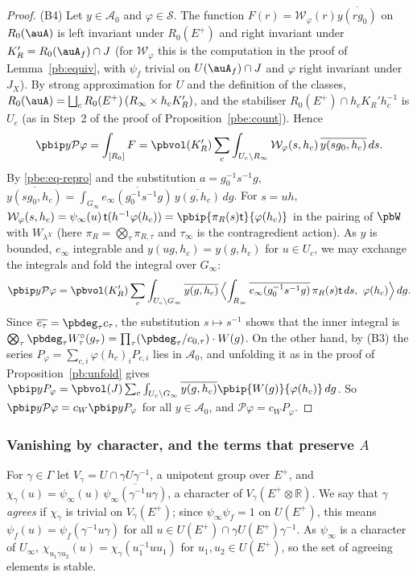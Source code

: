 \documentclass[10pt]{amsart}
\theoremstyle{definition}
\theoremstyle{remark}
\newcommand{\R}{\mathbb R}
\providecommand{\auAz}{\mathcal A_0}
\providecommand{\auP}{\mathcal P}
\providecommand{\auS}{\mathcal S}
\providecommand{\aubar}[1]{\overline{#1}}
\begin{document}
\begin{proof}
(B4) Let $y\in\auAz$ and $\varphi\in\auS$. The function $F(r)=\mathcal W_\varphi(r)\aubar{y(rg_0)}$ on
$R_0(\auA)$ is left invariant under $R_0(E^+)$ and right invariant under $K_R'=R_0(\auA_f)\cap J$
(for $\mathcal W_\varphi$ this is the computation in the proof of Lemma~\ref{pb:equiv}, with
$\psi_f$ trivial on $U(\auA_f)\cap J$ and $\varphi$ right invariant under $J_X$). By strong
approximation for $U$ and the definition of the classes, $R_0(\auA)=\bigsqcup_cR_0(E^+)\,(R_\infty
\times h_cK_R')$, and the stabiliser $R_0(E^+)\cap h_cK_R'h_c^{-1}$ is $U_c$ (as in Step~2 of the
proof of Proposition~\ref{pbe:count}). Hence
\[
\pbip y{\auP\varphi}=\int_{[R_0]}F=\pbvol(K_R')\sum_c\int_{U_c\backslash R_\infty}\mathcal W_\varphi(s,
h_c)\,\aubar{y(sg_0,h_c)}\,ds .
\]
By \eqref{pbe:eq-repro} and the substitution $a=g_0^{-1}s^{-1}g$, $\aubar{y(sg_0,h_c)}=\int_{G_\infty}
\aubar{e_\infty(g_0^{-1}s^{-1}g)}\,\aubar{y(g,h_c)}\,dg$. For $s=uh$, $\mathcal W_\varphi(s,h_c)=
\psi_\infty(u)\,\mathsf t(h^{-1}\varphi(h_c))=\pbip{\pi_R(s)\mathsf t}{\varphi(h_c)}$ in the pairing of
$\pbW$ with $W_{\lambda^X}$ (here $\pi_R=\bigotimes_\tau\pi_{R,\tau}$ and $\tau_\infty$ is the
contragredient action). As $y$ is bounded, $e_\infty$ integrable and $y(ug,h_c)=y(g,h_c)$ for $u\in
U_c$, we may exchange the integrals and fold the integral over $G_\infty$:
\[
\pbip y{\auP\varphi}=\pbvol(K_R')\sum_c\int_{U_c\backslash G_\infty}\aubar{y(g,h_c)}\,\Bigl\langle\int_{
R_\infty}\aubar{e_\infty(g_0^{-1}s^{-1}g)}\,\pi_R(s)\mathsf t\,ds,\ \varphi(h_c)\Bigr\rangle\,dg .
\]
Since $\aubar{e_\tau}=\pbdeg_\tau c_\tau$, the substitution $s\mapsto s^{-1}$ shows that the inner
integral is $\bigotimes_\tau\pbdeg_\tau W_\tau^\circ(g_\tau)=\prod_\tau(\pbdeg_\tau/c_{0,\tau})\cdot
W(g)$. On the other hand, by (B3) the series $P_\varphi=\sum_{c,i}\varphi(h_c)_iP_{c,i}$ lies in
$\auAz$, and unfolding it as in the proof of Proposition~\ref{pb:unfold} gives $\pbip y{P_\varphi}=
\pbvol(J)\sum_c\int_{U_c\backslash G_\infty}\aubar{y(g,h_c)}\pbip{W(g)}{\varphi(h_c)}\,dg$. So
$\pbip y{\auP\varphi}=c_W\pbip y{P_\varphi}$ for all $y\in\auAz$, and $\auP\varphi=c_WP_\varphi$.
\end{proof}

\subsubsection{Vanishing by character, and the terms that preserve \texorpdfstring{$A$}{A}}
\label{pbe:ss-char}

For $\gamma\in\Gamma$ let $V_\gamma=U\cap\gamma U\gamma^{-1}$, a unipotent group over $E^+$, and
$\chi_\gamma(u)=\psi_\infty(u)\,\aubar{\psi_\infty(\gamma^{-1}u\gamma)}$, a character of $V_\gamma(
E^+\otimes\R)$. We say that $\gamma$ \emph{agrees} if $\chi_\gamma$ is trivial on $V_\gamma(E^+)$;
since $\psi_\infty\psi_f=1$ on $U(E^+)$, this means $\psi_f(u)=\psi_f(\gamma^{-1}u\gamma)$ for all
$u\in U(E^+)\cap\gamma U(E^+)\gamma^{-1}$. As $\psi_\infty$ is a character of $U_\infty$, $\chi_{u_1
\gamma u_2}(u)=\chi_\gamma(u_1^{-1}uu_1)$ for $u_1,u_2\in U(E^+)$, so the set of agreeing elements is
stable.
\end{document}
